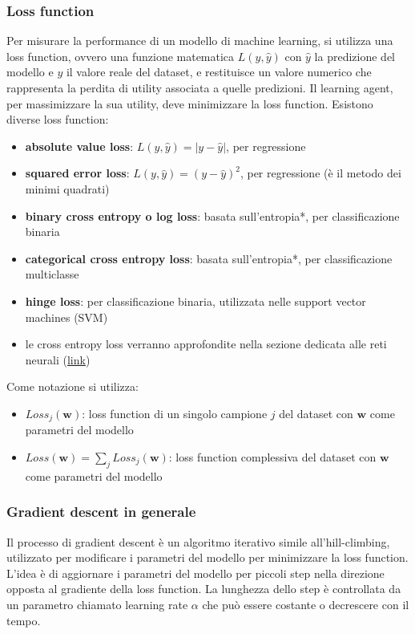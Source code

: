 \subsubsection*{Loss function}
Per misurare la performance di un modello di machine learning, si utilizza una loss function, ovvero una funzione matematica
\(L(y, \hat{y})\) con \(\hat{y}\) la predizione del modello e \(y\) il valore reale del dataset, e restituisce un valore numerico
che rappresenta la perdita di utility associata a quelle predizioni. Il learning agent, per massimizzare la sua utility, deve
minimizzare la loss function. Esistono diverse loss function:
\begin{itemize}
	\item \textbf{absolute value loss}: \(L(y, \hat{y}) = |y - \hat{y}|\), per regressione
	\item \textbf{squared error loss}: \(L(y, \hat{y}) = (y - \hat{y})^2\), per regressione (è il metodo dei minimi quadrati)
	\item \textbf{binary cross entropy o log loss}: basata sull'entropia*, per classificazione binaria
	\item \textbf{categorical cross entropy loss}: basata sull'entropia*, per classificazione multiclasse
	\item \textbf{hinge loss}: per classificazione binaria, utilizzata nelle support vector machines (SVM)
	\item[*] le cross entropy loss verranno approfondite nella sezione dedicata alle reti neurali (\hyperref[sec:loss_functions]{link})
\end{itemize}

\vspace{8pt}

\noindent
Come notazione si utilizza:
\begin{itemize}
	\item \(Loss_j (\textbf{w})\): loss function di un singolo campione \(j\) del dataset con \(\textbf{w}\) come parametri del modello
	\item \(Loss (\textbf{w}) = \sum_j Loss_j(\textbf{w})\): loss function complessiva del dataset con \(\textbf{w}\) come parametri del modello
\end{itemize}

\subsubsection*{Gradient descent in generale}
Il processo di gradient descent è un algoritmo iterativo simile all'hill-climbing, utilizzato per modificare i parametri del
modello per minimizzare la loss function. L'idea è di aggiornare i parametri del modello per piccoli step nella direzione opposta
al gradiente della loss function. La lunghezza dello step è controllata da un parametro chiamato learning rate \(\alpha\)
che può essere costante o decrescere con il tempo.

